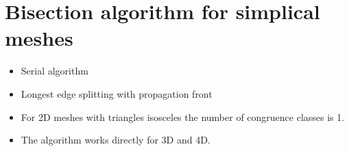 \documentclass{article}
\begin{document}
\section{Bisection algorithm for simplical meshes}
\label{sec:title}

\begin{itemize}
	\item Serial algorithm
	\item Longest edge splitting with propagation front
	\item For 2D meshes with triangles isosceles the number of congruence classes is 1. 
	\item The algorithm works directly for 3D and 4D.
\end{itemize}
\end{document}
